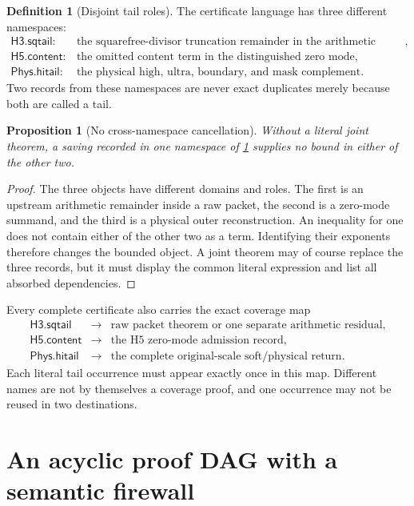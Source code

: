 \documentclass[11pt]{article}
\newtheorem{proposition}[theorem]{Proposition}
\theoremstyle{definition}
\newtheorem{definition}[theorem]{Definition}
\theoremstyle{remark}
\begin{document}
\begin{definition}[Disjoint tail roles]
\label{def:tails}
The certificate language has three different namespaces:
\[
\begin{array}{ll}
\mathsf{H3.sqtail}:&
 \text{the squarefree-divisor truncation remainder in the
 arithmetic packet},\\
\mathsf{H5.content}:&
 \text{the omitted content term in the distinguished zero mode},\\
\mathsf{Phys.hitail}:&
 \text{the physical high, ultra, boundary, and mask complement}.
\end{array}
\]
Two records from these namespaces are never exact duplicates merely
because both are called a tail.
\end{definition}

\begin{proposition}[No cross-namespace cancellation]
\label{prop:tails}
Without a literal joint theorem, a saving recorded in one namespace
of \cref{def:tails} supplies no bound in either of the other two.
\end{proposition}

\begin{proof}
The three objects have different domains and roles.  The first is an
upstream arithmetic remainder inside a raw packet, the second is a
zero-mode summand, and the third is a physical outer reconstruction.
An inequality for one does not contain either of the other two as a
term.  Identifying their exponents therefore changes the bounded
object.  A joint theorem may of course replace the three records, but
it must display the common literal expression and list all absorbed
dependencies.
\end{proof}

Every complete certificate also carries the exact coverage map
\[
\begin{array}{ccl}
\mathsf{H3.sqtail}&\longrightarrow&
 \text{raw packet theorem or one separate arithmetic residual},\\
\mathsf{H5.content}&\longrightarrow&
 \text{the H5 zero-mode admission record},\\
\mathsf{Phys.hitail}&\longrightarrow&
 \text{the complete original-scale soft/physical return}.
\end{array}
\]
Each literal tail occurrence must appear exactly once in this map.
Different names are not by themselves a coverage proof, and one
occurrence may not be reused in two destinations.

\section{An acyclic proof DAG with a semantic firewall}
\end{document}
